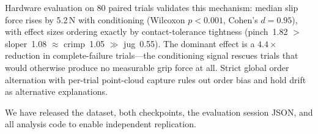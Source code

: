 \documentclass[11pt]{article}
\begin{document}
Hardware evaluation on 80 paired trials validates this mechanism: median slip force
rises by 5.2\,N with conditioning (Wilcoxon $p < 0.001$, Cohen's $d = 0.95$), with
effect sizes ordering exactly by contact-tolerance tightness (pinch~1.82 $>$
sloper~1.08 $\approx$ crimp~1.05 $\gg$ jug~0.55). The dominant effect is a
$4.4\times$ reduction in complete-failure trials---the conditioning signal rescues
trials that would otherwise produce no measurable grip force at all. Strict global
order alternation with per-trial point-cloud capture rules out order bias and hold
drift as alternative explanations.

We have released the dataset, both checkpoints, the evaluation session JSON, and
all analysis code to enable independent replication.



\end{document}
